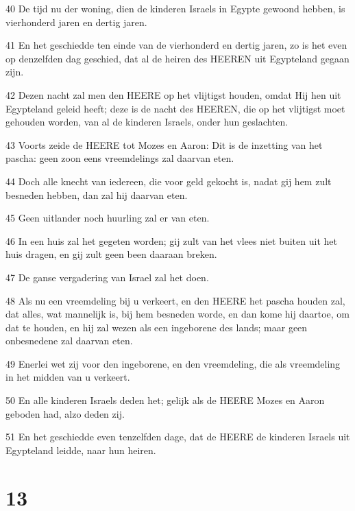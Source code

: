 \par 40 De tijd nu der woning, dien de kinderen Israels in Egypte gewoond hebben, is vierhonderd jaren en dertig jaren.
\par 41 En het geschiedde ten einde van de vierhonderd en dertig jaren, zo is het even op denzelfden dag geschied, dat al de heiren des HEEREN uit Egypteland gegaan zijn.
\par 42 Dezen nacht zal men den HEERE op het vlijtigst houden, omdat Hij hen uit Egypteland geleid heeft; deze is de nacht des HEEREN, die op het vlijtigst moet gehouden worden, van al de kinderen Israels, onder hun geslachten.
\par 43 Voorts zeide de HEERE tot Mozes en Aaron: Dit is de inzetting van het pascha: geen zoon eens vreemdelings zal daarvan eten.
\par 44 Doch alle knecht van iedereen, die voor geld gekocht is, nadat gij hem zult besneden hebben, dan zal hij daarvan eten.
\par 45 Geen uitlander noch huurling zal er van eten.
\par 46 In een huis zal het gegeten worden; gij zult van het vlees niet buiten uit het huis dragen, en gij zult geen been daaraan breken.
\par 47 De ganse vergadering van Israel zal het doen.
\par 48 Als nu een vreemdeling bij u verkeert, en den HEERE het pascha houden zal, dat alles, wat mannelijk is, bij hem besneden worde, en dan kome hij daartoe, om dat te houden, en hij zal wezen als een ingeborene des lands; maar geen onbesnedene zal daarvan eten.
\par 49 Enerlei wet zij voor den ingeborene, en den vreemdeling, die als vreemdeling in het midden van u verkeert.
\par 50 En alle kinderen Israels deden het; gelijk als de HEERE Mozes en Aaron geboden had, alzo deden zij.
\par 51 En het geschiedde even tenzelfden dage, dat de HEERE de kinderen Israels uit Egypteland leidde, naar hun heiren.

\chapter{13}

